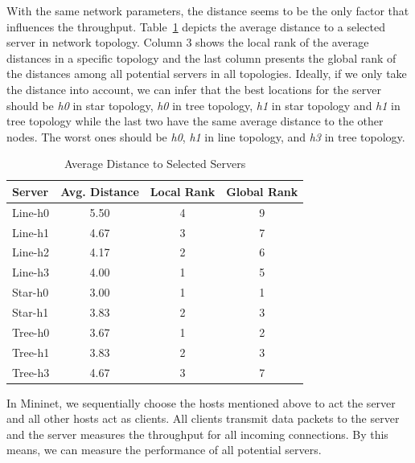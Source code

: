 With the same network parameters, the distance seems to be the only factor that 
influences the throughput. 
Table~\ref{table:distance} depicts the average distance to 
a selected server in network topology. Column 3 shows the local rank
of the average distances in a specific topology and the last 
column presents the global rank of the distances among all 
potential servers in all topologies. 
Ideally, if we only take the distance into account, 
we can infer that the best locations for the server should be {\it h0} 
in star topology, {\it h0} in tree topology, {\it h1} in star topology and 
{\it h1} in tree topology while the last two have the same average distance
to the other nodes. The worst ones should be {\it h0}, {\it h1} in line topology, 
and {\it h3} in tree topology.

\begin{table}[ht]
\centering
	\caption{Average Distance to Selected Servers}
	\label{table:distance}
	\begin{tabular}{|l||c|c|c|}
		\hline 
		Server   &  Avg. Distance & Local Rank & Global Rank \\ \hline\hline
		Line-h0  &   5.50  &  4   &  9 \\ \hline 
		Line-h1  &   4.67  &  3   &  7 \\ \hline 
		Line-h2  &   4.17  &  2   &  6 \\ \hline 
		Line-h3  &   4.00  &  1   &  5 \\ \hline\hline 
		Star-h0  &   3.00  &  1   &  1 \\ \hline 
        Star-h1  &   3.83  &  2   &  3 \\ \hline\hline 
		Tree-h0  &   3.67  &  1   &  2 \\ \hline 
		Tree-h1  &   3.83  &  2   &  3 \\ \hline 
		Tree-h3  &   4.67  &  3   &  7 \\ \hline 
	\end{tabular}
\end{table}

In Mininet, we sequentially choose the hosts mentioned above 
to act the server and all other hosts act as clients. All clients transmit
data packets to the server and the server measures the throughput for all 
incoming connections. By this means, we can measure the performance of 
all potential servers. 